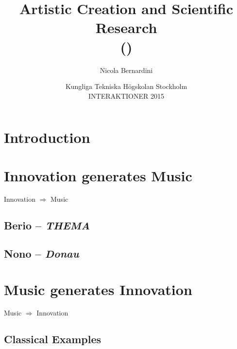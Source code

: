 \documentclass[\printmode,compress]{beamer}
\title[Artistic Creation and Scientific Research]
{%
    Artistic Creation and Scientific Research\\
	  {\tiny (\rcstag)}
}
\author{%
	Nicola Bernardini\\
    \href{mailto:\cpholderemail}{\cpholderemail}
}
\institute[SMERM]%
{%
	\href{http://www.conservatoriosantacecilia.it}
		 {Conservatorio di Musica ``S.Cecilia'' -- Roma}
}
\date[KTH Stockholm, 14/12/2015]{Kungliga Tekniska H\"ogskolan Stockholm\\INTERAKTIONER 2015}
\begin{document}
  
\begin{frame}
	\titlepage
\end{frame}



\section{Introduction}



\section[Innovation $\Rightarrow$ Music]{Innovation generates Music}

\begin{frame}
  \begin{center}
    {\huge\alert{Innovation $\Rightarrow$ Music}}
  \end{center}
\end{frame}

\subsection{Berio -- {\it THEMA}}



\subsection{Nono -- {\it Donau}}



\section[Music $\Rightarrow$ Innovation]{Music generates Innovation}

\begin{frame}
  \begin{center}
    {\huge\alert{Music $\Rightarrow$ Innovation}}
  \end{center}
\end{frame}

\subsection[Classics]{Classical Examples}


\end{document}
